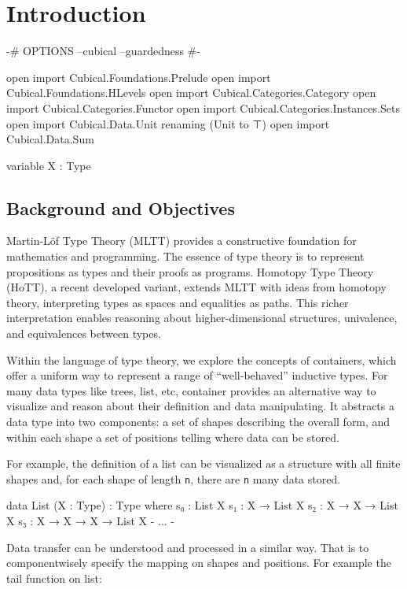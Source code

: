 \chapter{Introduction}

\begin{code}[hide]
{-# OPTIONS --cubical --guardedness #-}

open import Cubical.Foundations.Prelude
open import Cubical.Foundations.HLevels
open import Cubical.Categories.Category
open import Cubical.Categories.Functor
open import Cubical.Categories.Instances.Sets
open import Cubical.Data.Unit renaming (Unit to ⊤)
open import Cubical.Data.Sum

variable X : Type
\end{code}

\section{Background and Objectives}

Martin-Löf Type Theory (MLTT) provides a constructive foundation for mathematics and programming. The essence of type theory is to represent propositions as types and their proofs as programs. Homotopy Type Theory (HoTT), a recent developed variant, extends MLTT with ideas from homotopy theory, interpreting types as spaces and equalities as paths. This richer interpretation enables reasoning about higher-dimensional structures, univalence, and equivalences between types.

Within the language of type theory, we explore the concepts of containers, which offer a uniform way to represent a range of ``well-behaved'' inductive types. For many data types like trees, list, etc, container provides an alternative way to visualize and reason about their definition and data manipulating. It abstracts a data type into two components: a set of shapes describing the overall form, and within each shape a set of positions telling where data can be stored.

For example, the definition of a list can be visualized as a structure with all finite shapes and, for each shape of length \texttt{n}, there are \texttt{n} many data stored.

\begin{code}
data List (X : Type) : Type where
  s₀ : List X
  s₁ : X → List X
  s₂ : X → X → List X
  s₃ : X → X → X → List X
  {- ... -}
\end{code}

Data transfer can be understood and processed in a similar way. That is to componentwisely specify the mapping on shapes and positions. For example the tail function on list:

